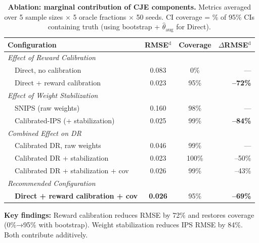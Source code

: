 \begin{table}[t]
\centering
\caption{\textbf{Ablation: marginal contribution of CJE components.} Metrics averaged over 5 sample sizes $\times$ 5 oracle fractions $\times$ 50 seeds. CI coverage = \% of 95\% CIs containing truth (using bootstrap + $\hat\theta_{\mathrm{aug}}$ for Direct).}
\label{tab:ablation}
\small
\begin{tabular}{@{}lccr@{}}
\toprule
\textbf{Configuration} & \textbf{RMSE$^{\mathrm{d}}$} & \textbf{Coverage} & \textbf{$\Delta$RMSE$^{\mathrm{d}}$} \\
\midrule
\multicolumn{4}{l}{\textit{Effect of Reward Calibration}} \\
~~Direct, no calibration & 0.083 & 0\% & --- \\
~~Direct + reward calibration & 0.023 & 95\% & \textbf{--72\%} \\
\midrule
\multicolumn{4}{l}{\textit{Effect of Weight Stabilization}} \\
~~SNIPS (raw weights) & 0.160 & 98\% & --- \\
~~Calibrated-IPS (+ stabilization) & 0.025 & 99\% & \textbf{--84\%} \\
\midrule
\multicolumn{4}{l}{\textit{Combined Effect on DR}} \\
~~Calibrated DR, raw weights & 0.046 & 99\% & --- \\
~~Calibrated DR + stabilization & 0.023 & 100\% & --50\% \\
~~Calibrated DR + stabilization + cov & 0.026 & 99\% & --43\% \\
\midrule
\multicolumn{4}{l}{\textit{Recommended Configuration}} \\
~~\textbf{Direct + reward calibration + cov} & \textbf{0.026} & 95\% & \textbf{--69\%} \\
\bottomrule
\end{tabular}
\vspace{1mm}

\footnotesize{
\textbf{Key findings:} Reward calibration reduces RMSE by 72\% and restores coverage (0\%→95\% with bootstrap).
Weight stabilization reduces IPS RMSE by 84\%. Both contribute additively.
}
\end{table}
